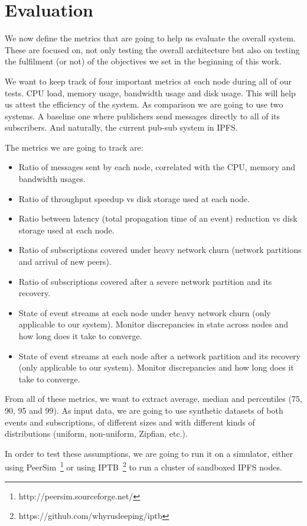 
%
%

\section{Evaluation}

We now define the metrics that are going to help us evaluate the overall system. These are focused on, not only
testing the overall architecture but also on testing the fulfilment (or not) of the objectives we set in the beginning of this
work.

We want to keep track of four important metrics at each node during all of our tests. CPU load, memory usage, bandwidth usage and disk usage. This will help us attest the efficiency of the system. As comparison we are going to use two systems. A baseline one where publishers send messages directly to all of its subscribers. And naturally, the current pub-sub system in IPFS.

The metrics we are going to track are:

\begin{itemize}
  \item Ratio of messages sent by each node, correlated with the CPU, memory and bandwidth usages.
  \item Ratio of throughput speedup vs disk storage used at each node.
  \item Ratio between latency (total propagation time of an event) reduction vs disk storage used at each node.
  \item Ratio of subscriptions covered under heavy network churn (network partitions and arrival of new peers).
  \item Ratio of subscriptions covered after a severe network partition and its recovery.
  \item State of event streams at each node under heavy network churn (only applicable to our system). Monitor discrepancies in state across nodes and how long does it take to converge.
  \item State of event streams at each node after a network partition and its recovery (only applicable to our system). Monitor discrepancies and how long does it take to converge.
\end{itemize}

From all of these metrics, we want to extract average, median and percentiles (75, 90, 95 and 99). As input data, we are going to use synthetic datasets of both events and subscriptions, of different sizes and with different kinds of distributions (uniform, non-uniform, Zipfian, etc.).

In order to test these assumptions, we are going to run it on a simulator, either using PeerSim~\footnote{http://peersim.sourceforge.net/} or using IPTB~\footnote{https://github.com/whyrusleeping/iptb} to run a cluster of sandboxed IPFS nodes.
